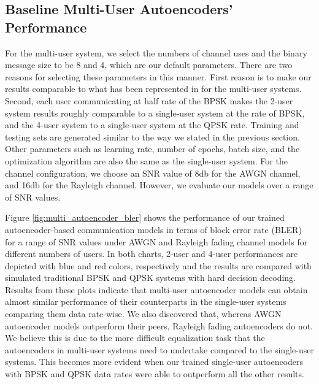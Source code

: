 \subsection{Baseline Multi-User Autoencoders' Performance}
For the multi-user system, we select the numbers of channel uses and the binary message size to be 8 and 4, which are our default parameters. There are two reasons for selecting these parameters in this manner. First reason is to make our results comparable to what has been represented in \cite{o2017introduction} for the multi-user systems. Second, each user communicating at half rate of the BPSK makes the 2-user system results roughly comparable to a single-user system at the rate of BPSK, and the 4-user system to a single-user system at the QPSK rate. Training and testing sets are generated similar to the way we stated in the previous section. Other parameters such as learning rate, number of epochs, batch size, and the optimization algorithm are also the same as the single-user system. For the channel configuration, we choose an SNR value of 8db for the AWGN channel, and 16db for the Rayleigh channel. However, we evaluate our models over a range of SNR values.

Figure \ref{fig:multi_autoencoder_bler} shows the performance of our trained autoencoder-based communication models in terms of block error rate (BLER) for a range of SNR values under AWGN and Rayleigh fading channel models for different numbers of users. In both charts, 2-user and 4-user performances are depicted with blue and red colors, respectively and the results are compared with simulated traditional BPSK and QPSK systems with hard decision decoding. Results from these plots indicate that multi-user autoencoder models can obtain almost similar performance of their counterparts in the single-user systems comparing them data rate-wise. We also discovered that, whereas AWGN autoencoder models outperform their peers, Rayleigh fading autoencoders do not. We believe this is due to the more difficult equalization task that the autoencoders in multi-user systems need to undertake compared to the single-user systems. This becomes more evident when our trained single-user autoencoders with BPSK and QPSK data rates were able to outperform all the other results.


